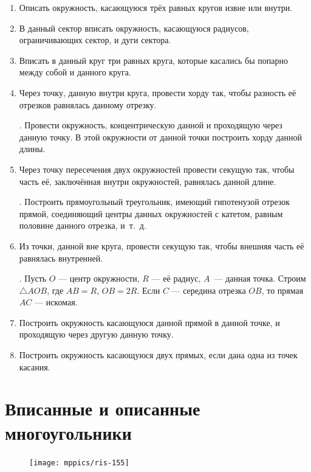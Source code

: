 \documentclass[oneside]{book}
\begin{document}
\begin{enumerate}[resume]
 \item
Описать окружность, касающуюся трёх равных кругов извне или внутри.

 \item
В данный сектор вписать окружность, касающуюся радиусов, ограничивающих сектор, и дуги сектора.

 \item
Вписать в данный круг три равных круга, которые касались бы попарно между собой и данного круга.

 \item
Через точку, данную внутри круга, провести хорду так, чтобы разность её отрезков равнялась данному отрезку.

\smallskip
{}.
Провести окружность, концентрическую данной и проходящую через данную точку.
В этой окружности от данной точки построить хорду данной длины.


 \item
Через точку пересечения двух окружностей провести секущую так, чтобы часть её, заключённая внутри окружностей, равнялась данной длине.

\smallskip
{}.
Построить прямоугольный треугольник, имеющий гипотенузой отрезок прямой, соединяющий центры данных окружностей с катетом, равным половине данного отрезка, и~т.~д.

 \item
Из точки, данной вне круга, провести секущую так, чтобы внешняя часть её равнялась внутренней.

\smallskip
{}.
Пусть $O$ — центр окружности, $R$ — её радиус, $A$~— данная точка.
Строим $\triangle AOB$, где $AB=R$, $OB=2R$.
Если $C$ — середина отрезка $OB$, то прямая $AC$ — искомая.

 \item
Построить окружность касающуюся данной прямой в данной точке, и проходящую через другую данную точку.

 \item
Построить окружность касающуюся двух прямых, если дана одна из точек касания.

\end{enumerate}


\section{Вписанные и описанные многоугольники}

\begin{figure}
\centering
\texttt{[image: mppics/ris-155]}
\caption{}\label{1938/ris-155}
\end{figure}
\end{document}
